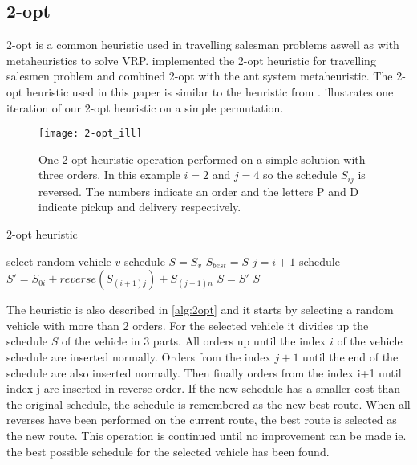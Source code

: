 \documentclass[../main.tex]{subfiles}
\begin{document}
\subsection{2-opt}
\label{sec:2opt}
2-opt is a common heuristic used in travelling salesman problems aswell as with metaheuristics to solve VRP. \cite{lin65} implemented the 2-opt heuristic for travelling salesmen problem and \cite{bullnheimer99} combined 2-opt with the ant system metaheuristic.
The 2-opt heuristic used in this paper is similar to the heuristic from \cite{carrabs07}.
 illustrates one iteration of our 2-opt heuristic on a simple permutation.

\begin{figure}                                                                                     
    \centering                                                                                 
    \texttt{[image: 2-opt\_ill]}                                     
    \caption{One 2-opt heuristic operation performed on a simple solution with three orders. In this example $i=2$ and $j=4$ so the schedule $S_{ij}$ is reversed. The numbers indicate an order and the letters P and D indicate pickup and delivery respectively.}
    \label{fig:2opt}
\end{figure}

\begin{algorithm}
    \caption{2-opt heuristic}\label{alg:2opt}
    \begin{algorithmic}[1]
        \State select random vehicle $v$
        \State schedule $S = S_v$
        \Repeat
        \State $S_{best} = S$
            \State $j=i+1$
                \State schedule $ S' = S_{0i} + reverse(S_{(i+1)j}) + S_{(j+1)n}$ 
                \State $S = S'$
                \EndIf
            \EndFor
        \EndFor
        \State 
        \Return $S$
        \EndFunction
    \end{algorithmic}
\end{algorithm}


The heuristic is also described in \cref{alg:2opt} and it starts by selecting a random vehicle with more than 2 orders.
For the selected vehicle it divides up the schedule $S$ of the vehicle in 3 parts. 
All orders up until the index $i$ of the vehicle schedule are inserted normally. 
Orders from the index $j+1$ until the end of the schedule are also inserted normally. 
Then finally orders from the index i+1 until index j are inserted in reverse order.
If the new schedule has a smaller cost than the original schedule, the schedule is remembered as the new best route. 
When all reverses have been performed on the current route, the best route is selected as the new route.
This operation is continued until no improvement can be made ie. the best possible schedule for the selected vehicle has been found.
\end{document}

